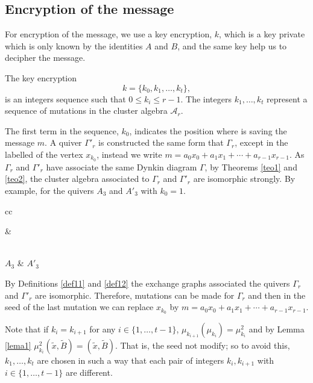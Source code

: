 \documentclass[12pt,a4paper]{article}
\begin{document}
\subsection{Encryption of the message}

For encryption of the message, we use a key encryption, $k$, which is a key private which is only known by
 the identities $A$ and $B$, and the same key help us to decipher the message.

The key encryption
\begin{equation}
k=\{k_0,k_1,\ldots,k_t \},
\label{eq6}
\end{equation}
is an integers sequence such that $0 \leq k_i \leq r-1$. The integers $k_1,\ldots, k_{t}$ represent a sequence of mutations in the cluster algebra $\mathcal{A}_r$.

The first term in the sequence, $k_0$, indicates the position where is saving the message $m$. A quiver $\Gamma'_r$ is constructed the same form that $\Gamma_r$, except in the labelled of the vertex $x_{k_0}$, instead we write $m=a_0x_0+a_1x_1 + \cdots + a_{r-1}x_{r-1}$. As $\Gamma_r$ and $\Gamma'_r$ have associate the same Dynkin diagram $\Gamma$, by Theorems \ref{teo1} and \ref{teo2}, the cluster algebra associated to $\Gamma_r$ and $\Gamma'_r$ are isomorphic strongly. By example, for the quivers $A_3$ and $A'_3$ with $k_0=1$.

\begin{center}
\begin{tabular}{cc}

 & 

 \\

$A_3$ & $A'_3$
\end{tabular}
\end{center}

By Definitions \ref{def11} and \ref{def12} the exchange graphs associated the quivers $\Gamma_r$ and $\Gamma'_r$ are isomorphic. Therefore, mutations can be made for $\Gamma_r$ and then in the seed of the last mutation we can replace $x_{k_0}$ by $m= a_0x_0+a_1x_1 + \cdots + a_{r-1}x_{r-1}$.

Note that if $k_i = k_{i+1}$ for any $i \in \lbrace 1,\ldots,t-1 \rbrace$, $\mu_{k_{i+1}}(\mu_{k_i}) = \mu^2_{k_i}$ and by Lemma \ref{lema1} $\mu^2_{k_i}(\tilde{x},\tilde{B})=(\tilde{x},\tilde{B})$. That is, the seed not modify; so to avoid this,  $k_1,\ldots, k_t$   are chosen  in such a way that each pair of integers $k_i,k_{i+1}$ with $i \in \lbrace 1,\ldots,t-1 \rbrace$ are different.
\end{document}
